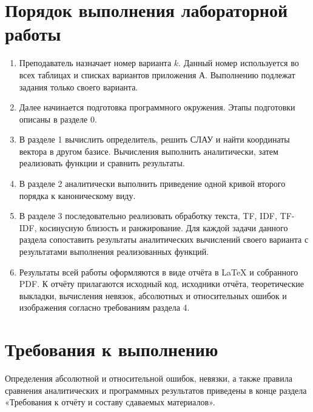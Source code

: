 \documentclass[12pt,a4paper]{article}
\begin{document}
\section*{Порядок выполнения лабораторной работы}
\begin{enumerate}

\item Преподаватель назначает номер варианта $k$. 
Данный номер используется во всех таблицах и списках вариантов приложения А. 
Выполнению подлежат задания только своего варианта.
\item Далее начинается подготовка программного окружения. 
Этапы подготовки описаны в разделе 0.
\item В разделе 1 вычислить определитель, решить СЛАУ и найти координаты
вектора в другом базисе. Вычисления выполнить аналитически, затем реализовать
функции и сравнить результаты.
\item В разделе 2 аналитически выполнить приведение одной кривой второго порядка к каноническому виду.
\newpage
\item В разделе 3 последовательно реализовать обработку текста, TF, IDF,
TF-IDF, косинусную близость и ранжирование. Для каждой задачи данного раздела
сопоставить результаты аналитических вычислений своего варианта с результатами выполнения реализованных функций.
\item Результаты всей работы оформляются в виде отчёта в LaTeX и собранного PDF. К отчёту прилагаются исходный код,
исходники отчёта, теоретические выкладки, вычисления невязок, абсолютных и относительных ошибок и изображения согласно требованиям раздела 4.
\end{enumerate}

\section*{Требования к выполнению}
Определения абсолютной и относительной ошибок, невязки, а также правила сравнения
аналитических и программных результатов приведены в конце раздела
«Требования к отчёту и составу сдаваемых материалов».
\end{document}

